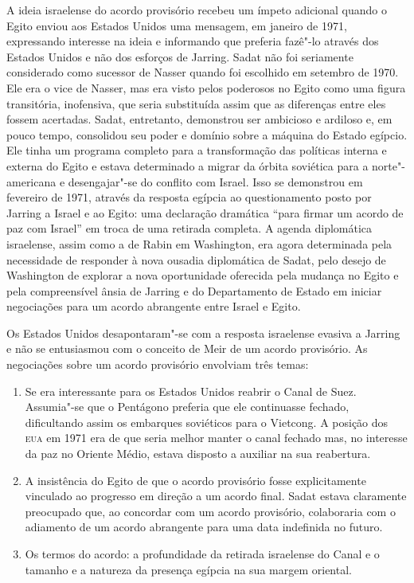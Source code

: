 A ideia israelense do acordo provisório recebeu um ímpeto adicional
quando o Egito enviou aos Estados Unidos uma mensagem, em janeiro de
1971, expressando interesse na ideia e informando que preferia fazê"-lo
através dos Estados Unidos e não dos esforços de Jarring. Sadat não foi
seriamente considerado como sucessor de Nasser quando foi escolhido em
setembro de 1970. Ele era o vice de Nasser, mas era visto pelos
poderosos no Egito como uma figura transitória, inofensiva, que seria
substituída assim que as diferenças entre eles fossem acertadas. Sadat,
entretanto, demonstrou ser ambicioso e ardiloso e, em pouco tempo,
consolidou seu poder e domínio sobre a máquina do Estado egípcio. Ele
tinha um programa completo para a transformação das políticas interna e
externa do Egito e estava determinado a migrar da órbita soviética para
a norte"-americana e desengajar"-se do conflito com Israel. Isso se
demonstrou em fevereiro de 1971, através da resposta egípcia ao
questionamento posto por Jarring a Israel e ao Egito: uma declaração
dramática ``para firmar um acordo de paz com Israel'' em troca de uma
retirada completa. A agenda diplomática israelense, assim como a de
Rabin em Washington, era agora determinada pela necessidade de responder
à nova ousadia diplomática de Sadat, pelo desejo de Washington de
explorar a nova oportunidade oferecida pela mudança no Egito e pela
compreensível ânsia de Jarring e do Departamento de Estado em iniciar
negociações para um acordo abrangente entre Israel e Egito.

Os Estados Unidos desapontaram"-se com a resposta israelense evasiva a
Jarring e não se entusiasmou com o conceito de Meir de um acordo
provisório. As negociações sobre um acordo provisório envolviam três
temas:

\begin{enumerate}
\def\labelenumi{\arabic{enumi}.}
\item
  Se era interessante para os Estados Unidos reabrir o Canal de Suez. Assumia"-se
  que o Pentágono preferia que ele continuasse fechado, dificultando
  assim os embarques soviéticos para o Vietcong. A posição dos \textsc{eua} em
  1971 era de que seria melhor manter o canal fechado mas, no interesse
  da paz no Oriente Médio, estava disposto a auxiliar na sua reabertura.
\item
  A insistência do Egito de que o acordo provisório fosse explicitamente
  vinculado ao progresso em direção a um acordo final. Sadat estava
  claramente preocupado que, ao concordar com um acordo provisório,
  colaboraria com o adiamento de um acordo abrangente para uma data
  indefinida no futuro.
\item
  Os termos do acordo: a profundidade da retirada israelense do Canal e
  o tamanho e a natureza da presença egípcia na sua margem oriental.
\end{enumerate}

